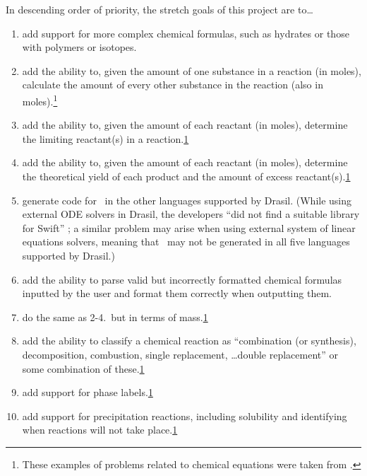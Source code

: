 \documentclass{article}
\begin{document}
In descending order of priority, the stretch goals of this project are to\dots

\begin{enumerate}
	\item add support for more complex chemical formulas, such as hydrates or those
	with polymers or isotopes.
	\item add the ability to, given the amount of one substance in a reaction (in
	moles), calculate the amount of every other substance in the reaction (also in
	moles).\footnote{\label{chemProbExs}These examples of problems related to
		chemical equations were taken from \cite{lund_introduction_2023}.}
	\item add the ability to, given the amount of each reactant (in moles),
	determine the limiting reactant(s) in a
	reaction.\cref{chemProbExs}
	\item add the ability to, given the amount of each reactant (in moles),
	determine the theoretical yield of each product and the amount of excess
	reactant(s).\cref{chemProbExs}
	\item generate code for \progname~in the other languages supported by
	Drasil. (While using external ODE solvers in Drasil, the developers ``did not
		find a suitable library for Swift'' \cite[p.~24]{chen_solving_2022}; a similar
		problem may arise when using external system of linear equations solvers,
		meaning that \progname~may not be generated in all five languages supported
		by Drasil.)
	\item add the ability to parse valid but incorrectly formatted chemical
	formulas inputted by the user and format them correctly when outputting them.
	\item do the same as 2-4.~but in terms of mass.\cref{chemProbExs}
	\item add the ability to classify a chemical reaction as ``combination (or
		synthesis), decomposition, combustion, single replacement, \dots double
		replacement'' \cite[p.~301]{lund_introduction_2023} or some combination of
		these.\cref{chemProbExs}
	\item add support for phase labels.\cref{chemProbExs}
	\item add support for precipitation reactions, including solubility and 
	identifying when reactions will not take place.\cref{chemProbExs}
\end{enumerate}

\newpage



\end{document}
